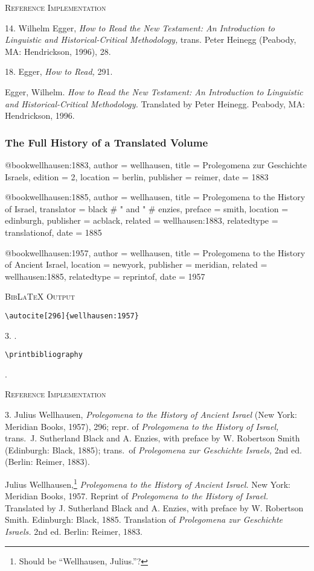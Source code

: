 \documentclass[a4paper]{article}
\newcommand\citetestns[3]{%
  {\textsc{BibLaTeX Output}\par
   \nobreak
   \texttt{\textbackslash autocite[#2]\{#3\}}\par
   \color{biblatex-colour}
   #1. \cite[#2]{#3}.\par
   \color{black}
   \texttt{\textbackslash printbibliography}\par
   \color{biblatex-colour}
   \hangindent\bibindent\bibentrycite{#3}.\par}}
\newenvironment{refimp}{%
  \begin{minipage}{\linewidth}
    \setlength{\parskip}{1ex}
    \textsc{Reference Implementation}\par
    \nobreak
    \color{reference-colour}
}{\end{minipage}}
\newenvironment{vb}{%
  \setlength{\parskip}{0pt}
  \verbatim}{\endverbatim}
\begin{document}
\begin{refimp}
  14. Wilhelm Egger, \emph{How to Read the New Testament: An Introduction to
  Linguistic and Historical-Critical Methodology,} trans. Peter Heinegg
  (Peabody, MA: Hendrickson, 1996), 28.

  18. Egger, \emph{How to Read,} 291.
  
  \hangindent\bibindent Egger, Wilhelm. \emph{How to Read the New Testament:
  An Introduction to Linguistic and Historical-Critical Methodology.}
  Translated by Peter Heinegg. Peabody, MA: Hendrickson, 1996.
\end{refimp}

\subsubsection{The Full History of a Translated Volume}

\begin{vb}
@book{wellhausen:1883,
  author = wellhausen,
  title = {Prolegomena zur Geschichte Israels},
  edition = {2},
  location = berlin,
  publisher = reimer,
  date = {1883}
}

@book{wellhausen:1885,
  author = wellhausen,
  title = {Prolegomena to the History of Israel},
  translator = black # " and " # enzies,
  preface = smith,
  location = edinburgh,
  publisher = acblack,
  related = {wellhausen:1883},
  relatedtype = {translationof},
  date = {1885}
}

@book{wellhausen:1957,
  author = wellhausen,
  title = {Prolegomena to the History of Ancient Israel},
  location = newyork,
  publisher = meridian,
  related = {wellhausen:1885},
  relatedtype = {reprintof},
  date = {1957}
}
\end{vb}

\citetestns{3}{296}{wellhausen:1957}

\begin{refimp}
  3. Julius Wellhausen, \emph{Prolegomena to the History of Ancient Israel}
  (New York: Meridian Books, 1957), 296; repr. of \emph{Prolegomena to the
  History of Israel,} trans.\ J. Sutherland Black and A. Enzies, with preface
  by W. Robertson Smith (Edinburgh: Black, 1885); trans.\ of \emph{Prolegomena
  zur Geschichte Israels,} 2nd ed. (Berlin: Reimer, 1883).

  \hangindent\bibindent Julius Wellhausen,\footnote{Should be “Wellhausen,
  Julius.”?} \emph{Prolegomena to the History of Ancient Israel.} New York:
  Meridian Books, 1957. Reprint of \emph{Prolegomena to the History of
  Israel.} Translated by J. Sutherland Black and A. Enzies, with preface by W.
  Robertson Smith. Edinburgh: Black, 1885. Translation of \emph{Prolegomena
  zur Geschichte Israels.} 2nd ed. Berlin: Reimer, 1883.
\end{refimp}
\end{document}
